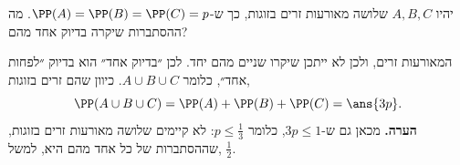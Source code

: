 יהיו $A,B,C$ שלושה מאורעות זרים בזוגות, כך ש-$\PP(A)=\PP(B)=\PP(C)=p$. מה ההסתברות שיקרה בדיוק אחד מהם?
\begin{solbox}
המאורעות זרים, ולכן לא ייתכן שיקרו שניים מהם יחד. לכן ״בדיוק אחד״ הוא בדיוק ״לפחות אחד״, כלומר $A\cup B\cup C$. כיוון שהם זרים בזוגות,
\[
\PP(A\cup B\cup C)=\PP(A)+\PP(B)+\PP(C)=\ans{3p}.
\]
\textbf{הערה.} מכאן גם ש-$3p\le1$, כלומר $p\le\frac13$: לא קיימים שלושה מאורעות זרים בזוגות, שההסתברות של כל אחד מהם היא, למשל, $\frac12$.
\end{solbox}
